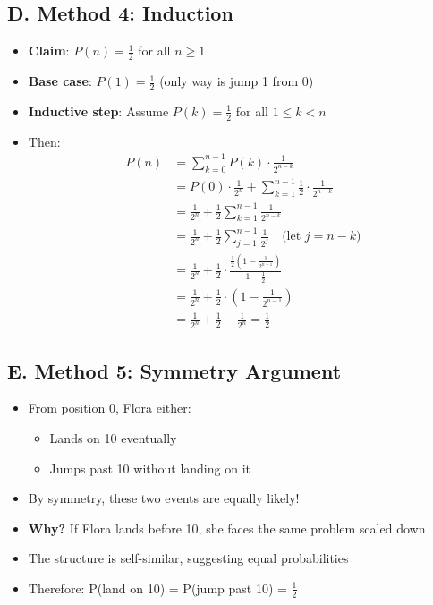 \documentclass[11pt]{article}
\begin{document}
\begin{conversionbox}
\subsection*{D. Method 4: Induction}
\begin{itemize}[leftmargin=*]
    \item \textbf{Claim}: $P(n) = \frac{1}{2}$ for all $n \geq 1$
    \item \textbf{Base case}: $P(1) = \frac{1}{2}$ (only way is jump 1 from 0)
    \item \textbf{Inductive step}: Assume $P(k) = \frac{1}{2}$ for all $1 \leq k < n$
    \item Then:
    \begin{align*}
    P(n) &= \sum_{k=0}^{n-1} P(k) \cdot \frac{1}{2^{n-k}}\\
    &= P(0) \cdot \frac{1}{2^n} + \sum_{k=1}^{n-1} \frac{1}{2} \cdot \frac{1}{2^{n-k}}\\
    &= \frac{1}{2^n} + \frac{1}{2} \sum_{k=1}^{n-1} \frac{1}{2^{n-k}}\\
    &= \frac{1}{2^n} + \frac{1}{2} \sum_{j=1}^{n-1} \frac{1}{2^j} \quad \text{(let } j = n-k \text{)}\\
    &= \frac{1}{2^n} + \frac{1}{2} \cdot \frac{\frac{1}{2}(1 - \frac{1}{2^{n-1}})}{1 - \frac{1}{2}}\\
    &= \frac{1}{2^n} + \frac{1}{2} \cdot (1 - \frac{1}{2^{n-1}})\\
    &= \frac{1}{2^n} + \frac{1}{2} - \frac{1}{2^n} = \frac{1}{2}
    \end{align*}
\end{itemize}

\subsection*{E. Method 5: Symmetry Argument}
\begin{itemize}[leftmargin=*]
    \item From position 0, Flora either:
    \begin{itemize}
        \item Lands on 10 eventually
        \item Jumps past 10 without landing on it
    \end{itemize}
    \item By symmetry, these two events are equally likely!
    \item \textbf{Why?} If Flora lands before 10, she faces the same problem scaled down
    \item The structure is self-similar, suggesting equal probabilities
    \item Therefore: P(land on 10) = P(jump past 10) = $\frac{1}{2}$
\end{itemize}
\end{conversionbox}
\end{document}
